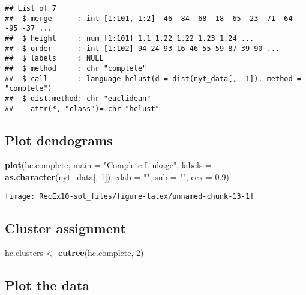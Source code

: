 \documentclass[
]{article}
\newenvironment{Shaded}{\begin{snugshade}}{\end{snugshade}}
\newcommand{\AttributeTok}[1]{\textcolor[rgb]{0.13,0.29,0.53}{#1}}
\newcommand{\DecValTok}[1]{\textcolor[rgb]{0.00,0.00,0.81}{#1}}
\newcommand{\FloatTok}[1]{\textcolor[rgb]{0.00,0.00,0.81}{#1}}
\newcommand{\FunctionTok}[1]{\textcolor[rgb]{0.13,0.29,0.53}{\textbf{#1}}}
\newcommand{\NormalTok}[1]{#1}
\newcommand{\OtherTok}[1]{\textcolor[rgb]{0.56,0.35,0.01}{#1}}
\newcommand{\StringTok}[1]{\textcolor[rgb]{0.31,0.60,0.02}{#1}}
\begin{document}
\begin{verbatim}
## List of 7
##  $ merge      : int [1:101, 1:2] -46 -84 -68 -18 -65 -23 -71 -64 -95 -37 ...
##  $ height     : num [1:101] 1.1 1.22 1.22 1.23 1.24 ...
##  $ order      : int [1:102] 94 24 93 16 46 55 59 87 39 90 ...
##  $ labels     : NULL
##  $ method     : chr "complete"
##  $ call       : language hclust(d = dist(nyt_data[, -1]), method = "complete")
##  $ dist.method: chr "euclidean"
##  - attr(*, "class")= chr "hclust"
\end{verbatim}

\subsection{Plot dendograms}\label{plot-dendograms}

\begin{Shaded}
\begin{Highlighting}[]
\FunctionTok{plot}\NormalTok{(hc.complete,}
     \AttributeTok{main =} \StringTok{"Complete Linkage"}\NormalTok{,}
     \AttributeTok{labels =} \FunctionTok{as.character}\NormalTok{(nyt\_data[, }\DecValTok{1}\NormalTok{]), }
     \AttributeTok{xlab =} \StringTok{""}\NormalTok{,}
     \AttributeTok{sub =} \StringTok{""}\NormalTok{,}
     \AttributeTok{cex =} \FloatTok{0.9}\NormalTok{)}
\end{Highlighting}
\end{Shaded}

\begin{center}\texttt{[image: RecEx10-sol\_files/figure-latex/unnamed-chunk-13-1]} \end{center}

\subsection{Cluster assignment}\label{cluster-assignment}

\begin{Shaded}
\begin{Highlighting}[]
\NormalTok{hc.clusters }\OtherTok{\textless{}{-}} \FunctionTok{cutree}\NormalTok{(hc.complete, }\DecValTok{2}\NormalTok{)}
\end{Highlighting}
\end{Shaded}

\subsection{Plot the data}\label{plot-the-data-1}
\end{document}
